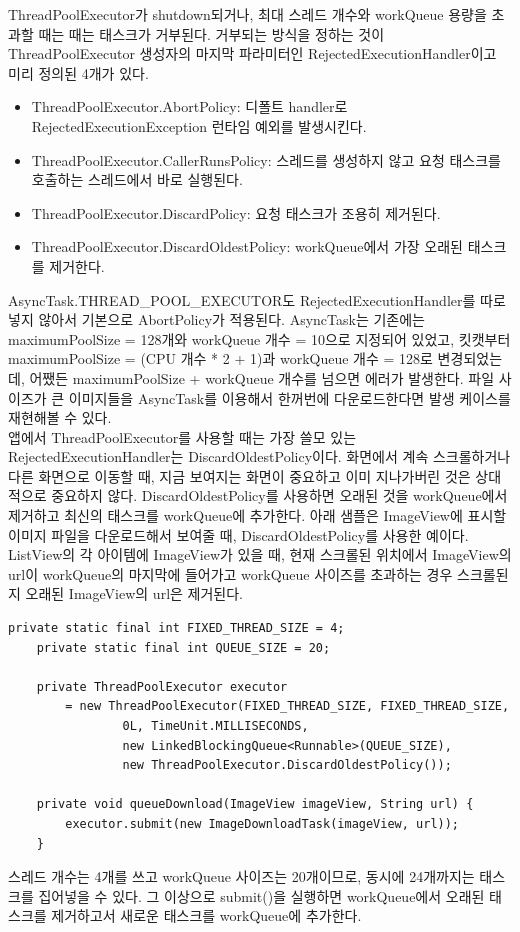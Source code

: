 ThreadPoolExecutor가 shutdown되거나, 최대 스레드 개수와 workQueue 용량을 초과할 때는 때는 태스크가 거부된다. 거부되는 방식을 정하는 것이 ThreadPoolExecutor 생성자의 마지막 파라미터인 RejectedExecutionHandler이고 미리 정의된 4개가 있다.
\begin{itemize}
\item ThreadPoolExecutor.AbortPolicy: 디폴트 handler로 RejectedExecutionException 런타임 예외를 발생시킨다.
\item ThreadPoolExecutor.CallerRunsPolicy: 스레드를 생성하지 않고 요청 태스크를 호출하는 스레드에서 바로 실행된다. 
\item ThreadPoolExecutor.DiscardPolicy: 요청 태스크가 조용히 제거된다.
\item ThreadPoolExecutor.DiscardOldestPolicy: workQueue에서 가장 오래된 태스크를 제거한다.
\end{itemize}

AsyncTask.THREAD\_POOL\_EXECUTOR도 RejectedExecutionHandler를 따로 넣지 않아서 기본으로 AbortPolicy가 적용된다. AsyncTask는 기존에는 maximumPoolSize = 128개와 workQueue 개수 = 10으로 지정되어 있었고, 킷캣부터 maximumPoolSize = (CPU 개수 * 2 + 1)과 workQueue 개수 = 128로 변경되었는데, 어쨌든 maximumPoolSize + workQueue 개수를 넘으면 에러가 발생한다. 파일 사이즈가 큰 이미지들을 AsyncTask를 이용해서 한꺼번에 다운로드한다면 발생 케이스를 재현해볼 수 있다.\\

앱에서 ThreadPoolExecutor를 사용할 때는 가장 쓸모 있는 RejectedExecutionHandler는 DiscardOldestPolicy이다. 
화면에서 계속 스크롤하거나 다른 화면으로 이동할 때, 지금 보여지는 화면이 중요하고 이미 지나가버린 것은 상대적으로 중요하지 않다. 
DiscardOldestPolicy를 사용하면 오래된 것을 workQueue에서 제거하고 최신의 태스크를 workQueue에 추가한다. 
아래 샘플은 ImageView에 표시할 이미지 파일을 다운로드해서 보여줄 때, DiscardOldestPolicy를 사용한 예이다.
ListView의 각 아이템에 ImageView가 있을 때, 현재 스크롤된 위치에서 ImageView의 url이 workQueue의 마지막에 들어가고 workQueue 사이즈를 초과하는 경우 스크롤된 지 오래된 ImageView의 url은 제거된다.
\begin{lstlisting}[frame=single] 
	private static final int FIXED_THREAD_SIZE = 4;
	private static final int QUEUE_SIZE = 20;
	
	private ThreadPoolExecutor executor
		= new ThreadPoolExecutor(FIXED_THREAD_SIZE, FIXED_THREAD_SIZE, 
				0L, TimeUnit.MILLISECONDS, 
				new LinkedBlockingQueue<Runnable>(QUEUE_SIZE), 
				new ThreadPoolExecutor.DiscardOldestPolicy());
	
	private void queueDownload(ImageView imageView, String url) {
		executor.submit(new ImageDownloadTask(imageView, url));
	}
\end{lstlisting}
스레드 개수는 4개를 쓰고 workQueue 사이즈는 20개이므로, 동시에 24개까지는 태스크를 집어넣을 수 있다. 그 이상으로 submit()을 실행하면 workQueue에서 오래된 태스크를 제거하고서 새로운 태스크를 workQueue에 추가한다.\\
	
